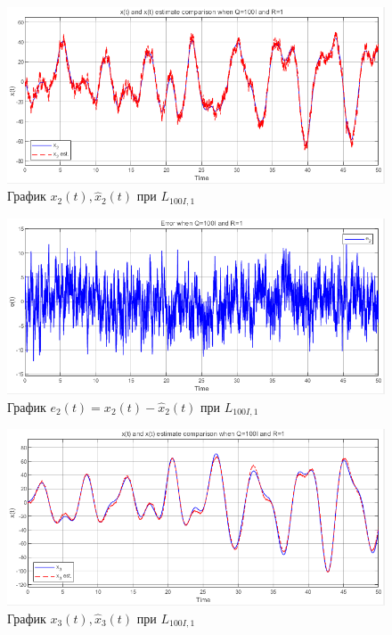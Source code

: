 \documentclass[a4paper, 12pt]{article}
\begin{document}
    \begin{figure}[H]
        \centering
        \includegraphics[scale=0.75]{2task_xx2.png}
        \captionsetup{skip=0pt}
        \caption{График $x_2(t),\hat{x}_2(t)$ при $L_{100I,1}$}
        \label{fig:2task_xx2}
    \end{figure}
    \begin{figure}[H]
        \centering
        \includegraphics[scale=0.75]{2task_ee2.png}
        \captionsetup{skip=0pt}
        \caption{График $e_2(t)=x_2(t)-\hat{x}_2(t)$ при $L_{100I,1}$}
        \label{fig:2task_ee2}
    \end{figure}
    \begin{figure}[H]
        \centering
        \includegraphics[scale=0.75]{2task_xx3.png}
        \captionsetup{skip=0pt}
        \caption{График $x_3(t),\hat{x}_3(t)$ при $L_{100I,1}$}
        \label{fig:2task_xx3}
    \end{figure}
\end{document}
